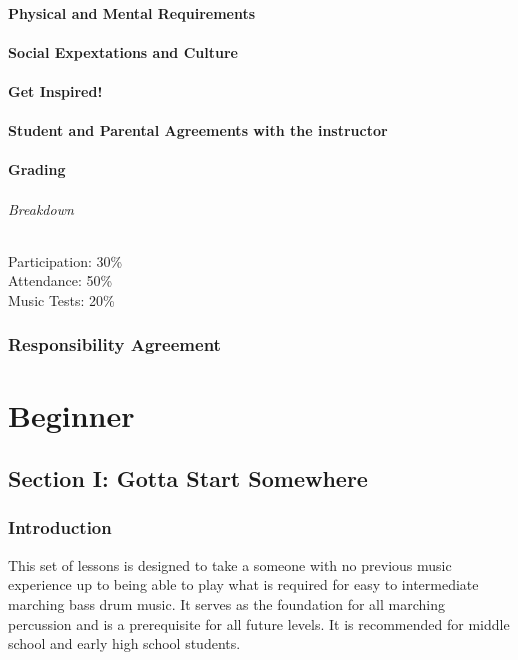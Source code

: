 \documentclass[12pt,letterpaper]{book}
\begin{document}
\subsection*{Physical and Mental Requirements}
\subsection*{Social Expextations and Culture}
\subsection*{Get Inspired!}
\subsection*{Student and Parental Agreements with the instructor}

\subsection*{Grading}
\paragraph{Breakdown}
Participation: 30\%\\
Attendance: 50\%\\
Music Tests: 20\%\\
\newpage

\section*{Responsibility Agreement}







\part{Beginner}

\chapter{Section I: Gotta Start Somewhere}

\section*{Introduction}

This set of lessons is designed to take a someone with no previous music experience up to being able to play what is required for easy to intermediate marching bass drum music.  It serves as the foundation for all marching percussion and is a prerequisite for all future levels.  It is recommended for middle school and early high school students.
\end{document}

